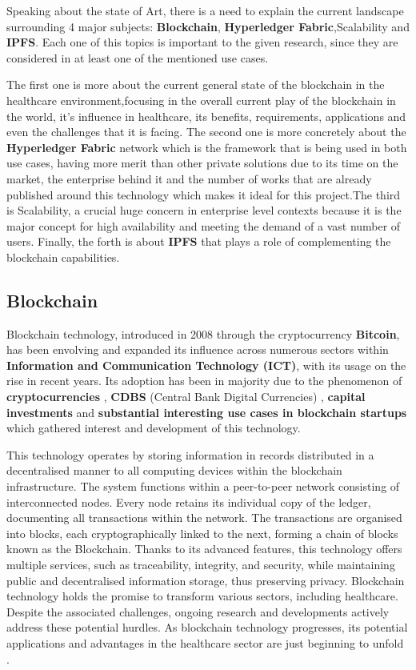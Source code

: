 Speaking about the state of Art, there is a need to explain the current landscape surrounding 4 major 
subjects: \textbf{Blockchain}, \textbf{Hyperledger Fabric},Scalability and 
\textbf{IPFS}. Each one of this topics is important to the given research, since they are considered in at 
least one of the mentioned use cases.

The first one is more about the current general state of the blockchain 
in the healthcare environment,focusing in the overall current play of the blockchain in the world, 
it's influence in healthcare, its benefits, requirements, applications and even the challenges that it is facing.
The second one is more concretely about the \textbf{Hyperledger Fabric} network which is the
framework that is being used in both use cases, having more merit than other private solutions due to its 
time on the market, the enterprise behind it and the number of works that are already published around this 
technology which makes it ideal for this project.The third is Scalability, a crucial huge concern in enterprise 
level contexts because it is the major concept for high availability and meeting the demand of a vast number of 
users. Finally, the forth is about \textbf{IPFS} that plays a role of complementing the blockchain capabilities.

\subsection{Blockchain}
Blockchain technology, introduced in 2008 through the cryptocurrency 
\textbf{Bitcoin}, has been envolving and expanded its influence across numerous sectors within 
\textbf{Information and Communication Technology (ICT)}, with its usage on the rise in recent years. Its adoption 
has been in majority due to the phenomenon of \textbf{cryptocurrencies} \cite{cryptocurrencies-phenomenom} ,
\textbf{CDBS} (Central Bank Digital Currencies) \cite{CDBC} , \textbf{capital investments} and 
\textbf{substantial interesting use cases in blockchain startups} which gathered interest and development of 
this technology. 

This technology operates by storing information in records distributed in a decentralised manner to all computing 
devices within the blockchain infrastructure. The system functions within a peer-to-peer network consisting of 
interconnected nodes. Every node retains its individual copy of the ledger, documenting all transactions within 
the network. The transactions are organised into blocks, each cryptographically linked to the next, forming a 
chain of blocks known as the Blockchain. Thanks to its advanced features, this technology offers multiple services, such as traceability, integrity, and security, while maintaining public and decentralised information storage, thus preserving privacy.
Blockchain technology holds the promise to transform various sectors, including healthcare. Despite the associated
challenges, ongoing research and developments actively address these potential hurdles. As blockchain 
technology progresses, its potential applications and advantages in the
healthcare sector are just beginning to unfold \cite{btc} \cite{healthcare-and-blockchain}. 

